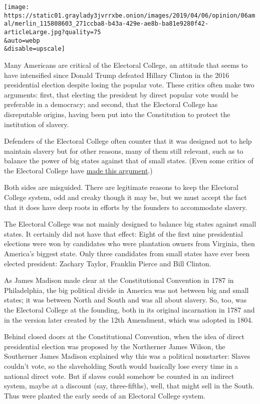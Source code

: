 \texttt{[image: https://static01.graylady3jvrrxbe.onion/images/2019/04/06/opinion/06amal/merlin\_115808603\_271ccba8-b43a-429e-ae8b-ba81e9280f42-articleLarge.jpg?quality=75\\\&auto=webp\\\&disable=upscale]}

Many Americans are critical of the Electoral College, an attitude that
seems to have intensified since Donald Trump defeated Hillary Clinton in
the 2016 presidential election despite losing the popular vote. These
critics often make two arguments: first, that electing the president by
direct popular vote would be preferable in a democracy; and second, that
the Electoral College has disreputable origins, having been put into the
Constitution to protect the institution of slavery.

Defenders of the Electoral College often counter that it was designed
not to help maintain slavery but for other reasons, many of them still
relevant, such as to balance the power of big states against that of
small states. (Even some critics of the Electoral College have
\href{https://www.nytimes3xbfgragh.onion/2019/04/04/opinion/the-electoral-college-slavery-myth.html}{made
this argument}.)

Both sides are misguided. There are legitimate reasons to keep the
Electoral College system, odd and creaky though it may be, but we must
accept the fact that it does have deep roots in efforts by the founders
to accommodate slavery.

The Electoral College was not mainly designed to balance big states
against small states. It certainly did not have that effect: Eight of
the first nine presidential elections were won by candidates who were
plantation owners from Virginia, then America's biggest state. Only
three candidates from small states have ever been elected president:
Zachary Taylor, Franklin Pierce and Bill Clinton.

As James Madison made clear at the Constitutional Convention in 1787 in
Philadelphia, the big political divide in America was not between big
and small states; it was between North and South and was all about
slavery. So, too, was the Electoral College at the founding, both in its
original incarnation in 1787 and in the version later created by the
12th Amendment, which was adopted in 1804.

Behind closed doors at the Constitutional Convention, when the idea of
direct presidential election was proposed by the Northerner James
Wilson, the Southerner James Madison explained why this was a political
nonstarter: Slaves couldn't vote, so the slaveholding South would
basically lose every time in a national direct vote. But if slaves could
somehow be counted in an indirect system, maybe at a discount (say,
three-fifths), well, that might sell in the South. Thus were planted the
early seeds of an Electoral College system.

